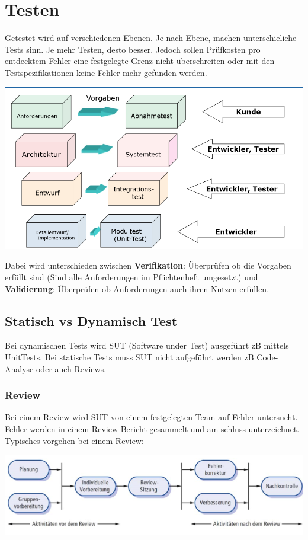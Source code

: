 \section{Testen}
Getestet wird auf verschiedenen Ebenen. Je nach Ebene, machen unterschieliche Tests sinn. Je mehr Testen, desto besser. Jedoch sollen Prüfkosten pro entdecktem Fehler eine festgelegte Grenz nicht überschreiten oder mit den Testspezifikationen keine Fehler mehr gefunden werden.
\begin{center}
	\includegraphics[width=\columnwidth]{Images/testen}
\end{center}

Dabei wird unterschieden zwischen \textbf{Verifikation}: Überprüfen ob die Vorgaben erfüllt sind (Sind alle Anforderungen im Pflichtenheft umgesetzt) und \textbf{Validierung}: Überprüfen ob Anforderungen auch ihren Nutzen erfüllen.

\subsection{Statisch vs Dynamisch Test}
Bei dynamischen Tests wird SUT (Software under Test) ausgeführt zB mittels UnitTests. Bei statische Tests muss SUT nicht aufgeführt werden zB Code-Analyse oder auch Reviews.

\subsubsection{Review}
Bei einem Review wird SUT von einem festgelegten Team auf Fehler untersucht. Fehler werden in einem Review-Bericht gesammelt und am schluss unterzeichnet. Typisches vorgehen bei einem Review:
\begin{center}
	\includegraphics[width=\columnwidth]{Images/review}
\end{center}


